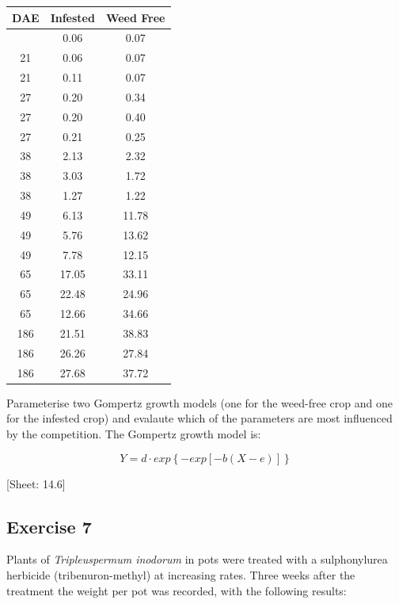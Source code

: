 \documentclass[a4paper,12pt,oneside]{book}
\begin{document}
\begin{longtable}[]{@{}ccc@{}}
\toprule\noalign{}
DAE & Infested & Weed Free \\
\midrule\noalign{}
\endhead
\bottomrule\noalign{}
\endlastfoot
21 & 0.06 & 0.07 \\
21 & 0.06 & 0.07 \\
21 & 0.11 & 0.07 \\
27 & 0.20 & 0.34 \\
27 & 0.20 & 0.40 \\
27 & 0.21 & 0.25 \\
38 & 2.13 & 2.32 \\
38 & 3.03 & 1.72 \\
38 & 1.27 & 1.22 \\
49 & 6.13 & 11.78 \\
49 & 5.76 & 13.62 \\
49 & 7.78 & 12.15 \\
65 & 17.05 & 33.11 \\
65 & 22.48 & 24.96 \\
65 & 12.66 & 34.66 \\
186 & 21.51 & 38.83 \\
186 & 26.26 & 27.84 \\
186 & 27.68 & 37.72 \\
\end{longtable}

Parameterise two Gompertz growth models (one for the weed-free crop and one for the infested crop) and evalaute which of the parameters are most influenced by the competition. The Gompertz growth model is:

\[Y = d \cdot exp\left\{- exp \left[ - b (X - e)\right] \right\}\]

{[}Sheet: 14.6{]}

\hypertarget{exercise-7-1}{%
\subsection{Exercise 7}\label{exercise-7-1}}

Plants of \emph{Tripleuspermum inodorum} in pots were treated with a sulphonylurea herbicide (tribenuron-methyl) at increasing rates. Three weeks after the treatment the weight per pot was recorded, with the following results:
\end{document}
